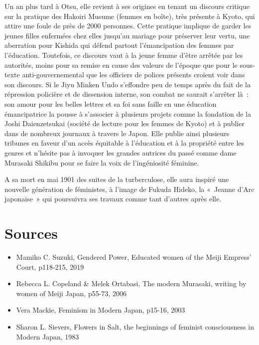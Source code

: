 \documentclass[11pt,a4paper]{article}
\begin{document}
Un an plus tard à Otsu, elle revient à ses origines en tenant un discours critique sur la pratique des Hakoiri Musume (femmes en boîte), très présente à Kyoto, qui attire une foule de près de 2000 personnes. Cette pratique implique de garder les jeunes filles enfermées chez elles jusqu'au mariage pour préserver leur vertu, une aberration pour Kishida qui défend partout l'émancipation des femmes par l'éducation. Toutefois, ce discours vaut à la jeune femme d'être arrêtée par les autorités, moins pour sa remise en cause des valeurs de l'époque que pour le sous-texte anti-gouvernemental que les officiers de polices présents croient voir dans son discours. Si le Jiyu Minken Undo s'effondre peu de temps après du fait de la répression policière et de dissension interne, son combat ne saurait s'arrêter là~: son amour pour les belles lettres et sa foi sans faille en une éducation émancipatrice la pousse à s'associer à plusieurs projets comme la fondation de la Joshi Daienzetsukai (société de lecture pour les femmes de Kyoto) et à publier dans de nombreux journaux à travers le Japon. Elle publie ainsi plusieurs tribunes en faveur d'un accès équitable à l'éducation et à la propriété entre les genres et n'hésite pas à invoquer les grandes autrices du passé comme dame Murasaki Shikibu pour se faire la voix de l'ingéniosité féminine.

A sa mort en mai 1901 des suites de la turberculose, elle aura inspiré une nouvelle génération de féministes, à l'image de Fukuda Hideko, la «~Jeanne d'Arc japonaise~» qui poursuivra ses travaux comme tant d'autres après elle.

\section{Sources}
\small

\begin{itemize}[leftmargin=1.3em,itemsep=.18em,topsep=.25em]
\item
  Mamiko C. Suzuki, Gendered Power, Educated women of the Meiji Empress' Court, p118-215, 2019
\item
  Rebecca L. Copeland \& Melek Ortabasi, The modern Murasaki, writing by women of Meiji Japan, p55-73, 2006
\item
  Vera Mackie, Feminism in Modern Japan, p15-16, 2003
\item
  Sharon L. Sievers, Flowers in Salt, the beginnings of feminist consciousness in Modern Japan, 1983
\end{itemize}
\end{document}
